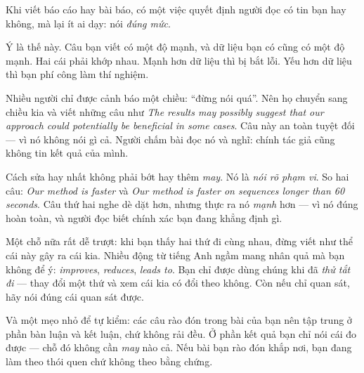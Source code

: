 \documentclass[../../english.tex]{subfiles}
\begin{document}
\begin{dongian}
Khi viết báo cáo hay bài báo, có một việc quyết định người đọc có tin bạn hay không, mà lại ít ai dạy: nói \emph{đúng mức}.

Ý là thế này. Câu bạn viết có một độ mạnh, và dữ liệu bạn có cũng có một độ mạnh. Hai cái phải khớp nhau. Mạnh hơn dữ liệu thì bị bắt lỗi. Yếu hơn dữ liệu thì bạn phí công làm thí nghiệm.

Nhiều người chỉ được cảnh báo một chiều: ``đừng nói quá''. Nên họ chuyển sang chiều kia và viết những câu như \emph{The results may possibly suggest that our approach could potentially be beneficial in some cases}. Câu này an toàn tuyệt đối --- vì nó không nói gì cả. Người chấm bài đọc nó và nghĩ: chính tác giả cũng không tin kết quả của mình.

Cách sửa hay nhất không phải bớt hay thêm \emph{may}. Nó là \emph{nói rõ phạm vi}. So hai câu: \emph{Our method is faster} và \emph{Our method is faster on sequences longer than 60 seconds}. Câu thứ hai nghe dè dặt hơn, nhưng thực ra nó \emph{mạnh} hơn --- vì nó đúng hoàn toàn, và người đọc biết chính xác bạn đang khẳng định gì.

Một chỗ nữa rất dễ trượt: khi bạn thấy hai thứ đi cùng nhau, đừng viết như thể cái này gây ra cái kia. Nhiều động từ tiếng Anh ngầm mang nhân quả mà bạn không để ý: \emph{improves}, \emph{reduces}, \emph{leads to}. Bạn chỉ được dùng chúng khi đã \emph{thử tắt đi} --- thay đổi một thứ và xem cái kia có đổi theo không. Còn nếu chỉ quan sát, hãy nói đúng cái quan sát được.

Và một mẹo nhỏ để tự kiểm: các câu rào đón trong bài của bạn nên tập trung ở phần bàn luận và kết luận, chứ không rải đều. Ở phần kết quả bạn chỉ nói cái đo được --- chỗ đó không cần \emph{may} nào cả. Nếu bài bạn rào đón khắp nơi, bạn đang làm theo thói quen chứ không theo bằng chứng.
\end{dongian}
\end{document}
